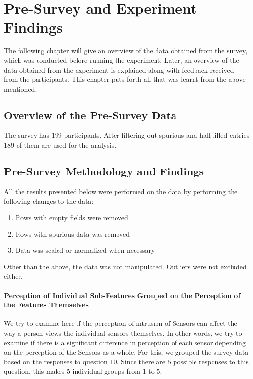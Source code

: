 
\chapter{Pre-Survey and Experiment Findings}
The following chapter will give an overview of the data obtained from the survey, which was conducted before running the experiment.
Later, an overview of the data obtained from the experiment is explained along with feedback received from the participants. This chapter puts forth
all that was learnt from the above mentioned.


\section{Overview of the Pre-Survey Data}
The survey has 199 participants. After filtering out spurious and half-filled entries 189 of them are used for the analysis.



\section{Pre-Survey Methodology and Findings}
All the results presented below were performed on the data by performing the following changes to the data:
\begin{enumerate}
\item Rows with empty fields were removed
\item Rows with spurious data was removed
\item Data was scaled or normalized when necessary
\end{enumerate}

Other than the above, the data was not manipulated. Outliers were not excluded either.

\subsubsection{Perception of Individual Sub-Features Grouped on the Perception of the Features Themselves}
We try to examine here if the perception of intrusion  of Sensors can affect the way a person views the individual sensors themselves. In other
words, we try to examine if there is a significant difference in perception of each sensor depending on the perception of the Sensors as a whole.
For this, we grouped the survey data based on the responses to question 10. Since there are 5 possible responses to this question, this makes 5 individual groups from 1 to 5.

